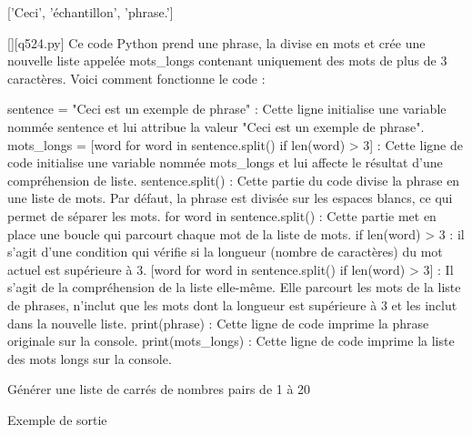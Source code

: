 ['Ceci', 'échantillon', 'phrase.']
        \par
        \begin{solution}
            \renewcommand{\nomfichier}{q524.py}
            \pythonfile{\chemincode \nomfichier}[][\nomfichier]
            Ce code Python prend une phrase, la divise en mots et crée une nouvelle liste appelée mots_longs contenant uniquement des mots de plus de 3 caractères. Voici comment fonctionne le code :

    sentence = "Ceci est un exemple de phrase" : Cette ligne initialise une variable nommée sentence et lui attribue la valeur "Ceci est un exemple de phrase".
    mots_longs = [word for word in sentence.split() if len(word) > 3] : Cette ligne de code initialise une variable nommée mots_longs et lui affecte le résultat d'une compréhension de liste.
        sentence.split() : Cette partie du code divise la phrase en une liste de mots. Par défaut, la phrase est divisée sur les espaces blancs, ce qui permet de séparer les mots.
        for word in sentence.split() : Cette partie met en place une boucle qui parcourt chaque mot de la liste de mots.
        if len(word) > 3 : il s'agit d'une condition qui vérifie si la longueur (nombre de caractères) du mot actuel est supérieure à 3.
        [word for word in sentence.split() if len(word) > 3] : Il s'agit de la compréhension de la liste elle-même. Elle parcourt les mots de la liste de phrases, n'inclut que les mots dont la longueur est supérieure à 3 et les inclut dans la nouvelle liste.
    print(phrase) : Cette ligne de code imprime la phrase originale sur la console.
    print(mots_longs) : Cette ligne de code imprime la liste des mots longs sur la console.
        \end{solution}
        

        \question
        Générer une liste de carrés de nombres pairs de 1 à 20

Exemple de sortie

